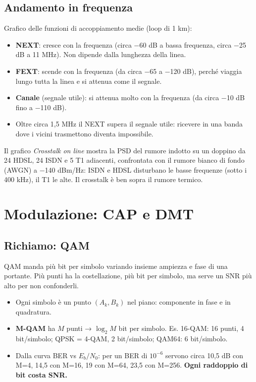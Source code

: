 \subsection{Andamento in frequenza}

Grafico delle funzioni di accoppiamento medie (loop di 1 km):

\begin{itemize}
\tightlist
\item
  \textbf{NEXT}: cresce con la frequenza (circa −60 dB a bassa frequenza, circa −25 dB a 11 MHz). Non dipende dalla lunghezza della linea.
\item
  \textbf{FEXT}: scende con la frequenza (da circa −65 a −120 dB), perché viaggia lungo tutta la linea e si attenua come il segnale.
\item
  \textbf{Canale} (segnale utile): si attenua molto con la frequenza (da circa −10 dB fino a −110 dB).
\item
  Oltre circa 1,5 MHz il NEXT supera il segnale utile: ricevere in una banda dove i vicini trasmettono diventa impossibile.
\end{itemize}

Il grafico \emph{Crosstalk on line} mostra la PSD del rumore indotto su un doppino da 24 HDSL, 24 ISDN e 5 T1 adiacenti, confrontata con il rumore bianco di fondo (AWGN) a −140 dBm/Hz: ISDN e HDSL disturbano le basse frequenze (sotto i 400 kHz), il T1 le alte. Il crosstalk è ben sopra il rumore termico.

\section{Modulazione: CAP e DMT}

\subsection{Richiamo: QAM}

\begin{inbreve}

QAM manda più bit per simbolo variando insieme ampiezza e fase di una portante. Più punti ha la costellazione, più bit per simbolo, ma serve un SNR più alto per non confonderli.

\end{inbreve}

\begin{itemize}
\tightlist
\item
  Ogni simbolo è un punto \((A_k, B_k)\) nel piano: componente in fase e in quadratura.
\item
  \textbf{M-QAM} ha \(M\) punti → \(\log_2 M\) bit per simbolo. Es. 16-QAM: 16 punti, 4 bit/simbolo; QPSK = 4-QAM, 2 bit/simbolo; QAM64: 6 bit/simbolo.
\item
  Dalla curva BER vs \(E_b/N_0\): per un BER di \(10^{-6}\) servono circa 10,5 dB con M=4, 14,5 con M=16, 19 con M=64, 23,5 con M=256. \textbf{Ogni raddoppio di bit costa SNR.}
\end{itemize}

